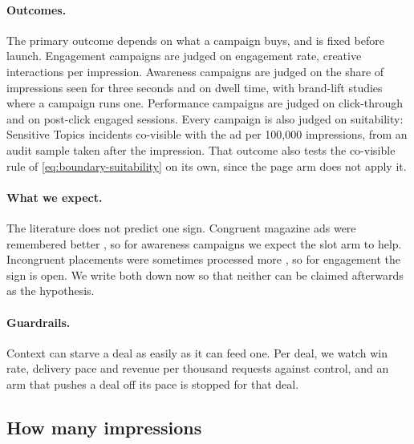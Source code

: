 \paragraph{Outcomes.} The primary outcome depends on what a campaign buys, and is fixed before launch. Engagement campaigns are judged on engagement rate, creative interactions per impression. Awareness campaigns are judged on the share of impressions seen for three seconds and on dwell time, with brand-lift studies where a campaign runs one. Performance campaigns are judged on click-through and on post-click engaged sessions. Every campaign is also judged on suitability: Sensitive Topics incidents co-visible with the ad per 100,000 impressions, from an audit sample taken after the impression. That outcome also tests the co-visible rule of \cref{eq:boundary-suitability} on its own, since the page arm does not apply it.

\paragraph{What we expect.} The literature does not predict one sign. Congruent magazine ads were remembered better \citep{moorman2002effects}, so for awareness campaigns we expect the slot arm to help. Incongruent placements were sometimes processed more \citep{dahlen2008could}, so for engagement the sign is open. We write both down now so that neither can be claimed afterwards as the hypothesis.

\paragraph{Guardrails.} Context can starve a deal as easily as it can feed one. Per deal, we watch win rate, delivery pace and revenue per thousand requests against control, and an arm that pushes a deal off its pace is stopped for that deal.

\subsection{How many impressions}\label{sec:protocol-power}

